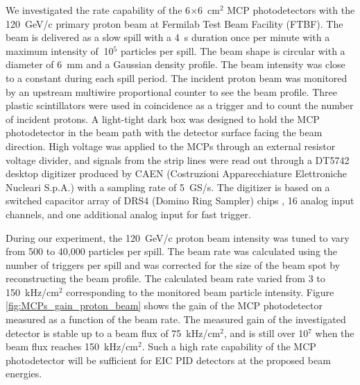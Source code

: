 \documentclass[preprint,5p]{elsarticle}
\begin{document}
We investigated the rate capability of the 6$\times$6~cm$^2$ MCP photodetectors 
with the 120~GeV/c primary proton beam at Fermilab Test Beam Facility (FTBF).  
The beam is delivered as a slow spill with a 4~s duration once per minute with 
a maximum intensity of $~$10$^5$ particles per spill. The beam shape is 
circular with a diameter of 6~mm and a Gaussian density profile.  The beam 
intensity was close to a constant during each spill period. The incident proton 
beam was monitored by an upstream multiwire proportional counter to see the 
beam profile. Three plastic scintillators were used in coincidence as a trigger 
and to count the number of incident protons. A light-tight dark box was 
designed to hold the MCP photodetector in the beam path with the detector 
surface facing the beam direction. High voltage was applied to the MCPs through 
an external resistor voltage divider, and signals from the strip lines were 
read out through a DT5742 desktop digitizer \cite{Digitizer} produced by CAEN 
(Costruzioni Apparecchiature Elettroniche Nucleari S.p.A.) with a sampling rate 
of 5~GS/s. The digitizer is based on a switched capacitor array of DRS4 (Domino 
Ring Sampler) chips \cite{DRS}, 16 analog input channels, and one additional 
analog input for fast trigger.

During our experiment, the 120~GeV/c proton beam intensity was tuned to vary 
from 500 to 40,000 particles per spill. The beam rate was calculated using the 
number of triggers per spill and was corrected for the size of the beam spot by 
reconstructing the beam profile. The calculated beam rate varied from 3 to 
150~kHz/cm$^2$ corresponding to the monitored beam particle intensity. Figure 
\ref{fig:MCPs_gain_proton_beam} shows the gain of the MCP photodetector 
measured as a function of the beam rate. The measured gain of the investigated 
detector is stable up to a beam flux of 75~kHz/cm$^2$, and is still over 10$^7$ 
when the beam flux reaches 150~kHz/cm$^2$. Such a high rate capability of the 
MCP photodetector will be sufficient for EIC PID detectors at the proposed beam 
energies.
\end{document}
